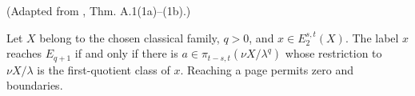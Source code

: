 \begin{theorem}
\label{frontier:Literature:3aad75009ef0}
(Adapted from \cite{BHS}, Thm. A.1(1a)--(1b).)\par{}

Let $X$ belong to the chosen classical family, $q>0$, and $x\in E_2^{s,t}(X)$. The label $x$ reaches $E_{q+1}$ if and only if there is $a\in\pi_{t-s,t}(\nu X/\lambda^q)$ whose restriction to $\nu X/\lambda$ is the first-quotient class of $x$. Reaching a page permits zero and boundaries.
\end{theorem}

